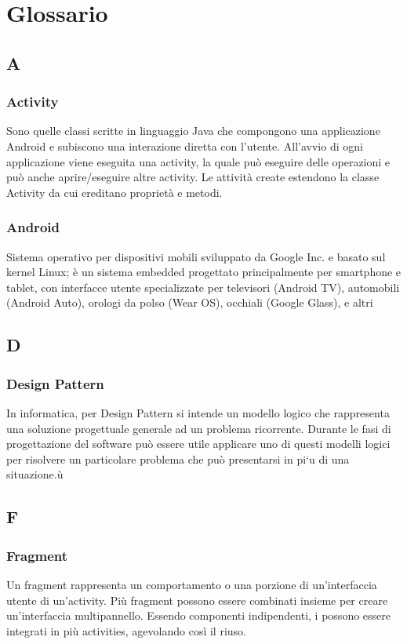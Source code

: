 \section{Glossario}
\subsection*{A}
\subsubsection*{Activity}
Sono quelle classi scritte in linguaggio Java che compongono una applicazione Android e subiscono
una interazione diretta con l'utente. All'avvio di ogni applicazione viene eseguita una activity, la
quale può eseguire delle operazioni e può anche aprire/eseguire altre activity. Le attività create
estendono la classe Activity da cui ereditano proprietà e metodi.

\subsubsection*{Android}
Sistema operativo per dispositivi mobili sviluppato da Google Inc. e basato sul kernel Linux; è
un sistema embedded progettato principalmente per smartphone e tablet, con interfacce utente
specializzate per televisori (Android TV), automobili (Android Auto), orologi da polso (Wear
OS), occhiali (Google Glass), e altri

\subsection*{D}
\subsubsection*{Design Pattern}
In informatica, per Design Pattern si intende un modello logico che rappresenta una soluzione progettuale generale ad un problema ricorrente. Durante le fasi di progettazione del software può essere utile applicare uno di questi modelli logici per risolvere un particolare
problema che può presentarsi in pi`u di una situazione.ù

\subsection*{F}
\subsubsection*{Fragment}
Un fragment rappresenta un comportamento o una porzione di un'interfaccia utente di un'activity. Più fragment possono essere combinati insieme per creare un'interfaccia multipannello. Essendo componenti indipendenti, i possono essere integrati in più activities, agevolando così il riuso.



